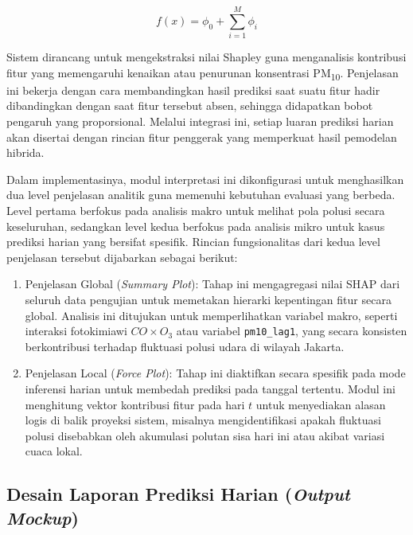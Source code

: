 \begin{equation}
f(x) = \phi_0 + \sum_{i=1}^{M} \phi_i
\label{eq:shap_val}
\end{equation}

Sistem dirancang untuk mengekstraksi nilai Shapley guna menganalisis kontribusi fitur yang memengaruhi kenaikan atau penurunan konsentrasi PM\textsubscript{10}. Penjelasan ini bekerja dengan cara membandingkan hasil prediksi saat suatu fitur hadir dibandingkan dengan saat fitur tersebut absen, sehingga didapatkan bobot pengaruh yang proporsional. Melalui integrasi ini, setiap luaran prediksi harian akan disertai dengan rincian fitur penggerak yang memperkuat hasil pemodelan hibrida.

Dalam implementasinya, modul interpretasi ini dikonfigurasi untuk menghasilkan dua level penjelasan analitik guna memenuhi kebutuhan evaluasi yang berbeda. Level pertama berfokus pada analisis makro untuk melihat pola polusi secara keseluruhan, sedangkan level kedua berfokus pada analisis mikro untuk kasus prediksi harian yang bersifat spesifik. Rincian fungsionalitas dari kedua level penjelasan tersebut dijabarkan sebagai berikut:

\begin{enumerate}
    \item[(a)] {Penjelasan Global (\textit{Summary Plot}):} Tahap ini mengagregasi nilai SHAP dari seluruh data pengujian untuk memetakan hierarki kepentingan fitur secara global. Analisis ini ditujukan untuk memperlihatkan variabel makro, seperti interaksi fotokimiawi $CO \times O_3$ atau variabel \texttt{pm10\_lag1}, yang secara konsisten berkontribusi terhadap fluktuasi polusi udara di wilayah Jakarta.
    \item[(b)] {Penjelasan Local (\textit{Force Plot}):} Tahap ini diaktifkan secara spesifik pada mode inferensi harian untuk membedah prediksi pada tanggal tertentu. Modul ini menghitung vektor kontribusi fitur pada hari $t$ untuk menyediakan alasan logis di balik proyeksi sistem, misalnya mengidentifikasi apakah fluktuasi polusi disebabkan oleh akumulasi polutan sisa hari ini atau akibat variasi cuaca lokal.
\end{enumerate}

\subsection{Desain Laporan Prediksi Harian (\textit{Output Mockup})}

